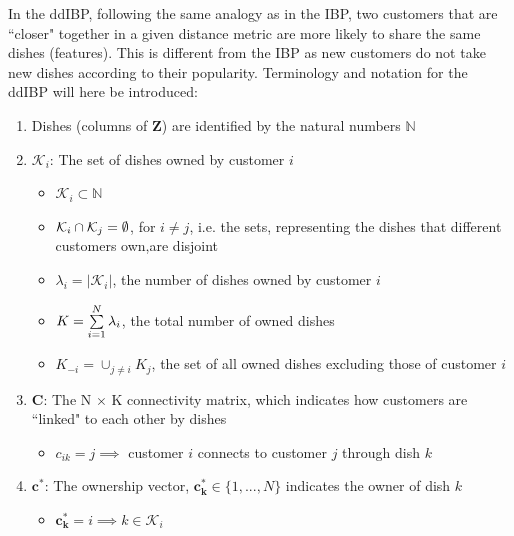 \noindent
In the ddIBP, following the same analogy as in the IBP, two customers that are
``closer" together in a given distance metric are more likely to share the same
dishes (features). This is different from the IBP as new customers do not take
new dishes according to their popularity. Terminology and notation for the ddIBP
will here be introduced:

\begin{enumerate}
  \item Dishes (columns of $\bm Z$) are identified by the natural numbers 
        $\mathbb{N}$

  \item $\mathcal{K}_i$: The set of dishes owned by customer $i$
  \begin{itemize}
    \item $\mathcal{K}_i \subset \mathbb{N}$
    \item $\mathcal{K}_i \cap \mathcal{K}_j = \emptyset$, for $i \ne j$, i.e. the sets, 
                                                   representing the dishes that 
                                                   different customers own,are
                                                   disjoint
    \item $\lambda_i = |\mathcal{K}_i|$, the number of dishes owned
                                         by customer $i$
    \item $K = \sum\limits_{i=1}^{N} \lambda_i$, the total number of owned dishes 
    \item $K_{-i} = \cup_{j \ne i}K_j$, the set of all owned dishes excluding those
                                        of customer $i$
  \end{itemize}

  \item $\bm C$: The N $\times $ K connectivity matrix, which indicates how 
                 customers are ``linked" to each other by dishes
  \begin{itemize}
    \item $c_{ik} = j \implies$ customer $i$ connects to customer $j$ through
          dish $k$
  \end{itemize}

  \item $\bm{c^*}$: The ownership vector, $\bm{c_k^*} \in \{1,...,N\}$ indicates
                   the owner of dish $k$
  \begin{itemize}
    \item $\bm{c_k^*}=i \implies k \in \mathcal{K}_i$
  \end{itemize}


\end{enumerate}
